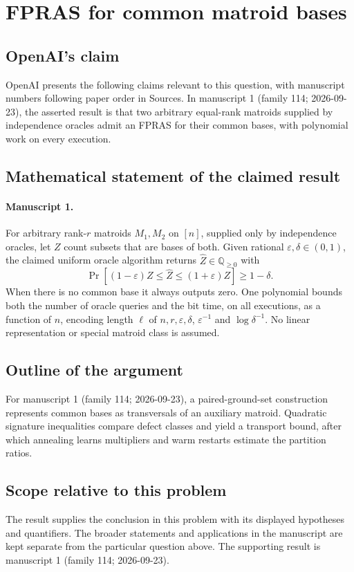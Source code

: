 \documentclass[11pt]{article}
\begin{document}
\section*{FPRAS for common matroid bases}

\subsection{OpenAI's claim}
OpenAI presents the following claims relevant to this question, with manuscript numbers following paper order in Sources. In manuscript 1 (family 114; 2026-09-23), the asserted result is that two arbitrary equal-rank matroids supplied by independence oracles admit an FPRAS for their common bases, with polynomial work on every execution.

\subsection{Mathematical statement of the claimed result}
\paragraph{Manuscript 1.}
For arbitrary rank-$r$ matroids $M_1,M_2$ on $[n]$, supplied only by independence oracles, let $Z$ count subsets that are bases of both. Given rational $\varepsilon,\delta\in(0,1)$, the claimed uniform oracle algorithm returns $\widehat Z\in\mathbb Q_{\ge0}$ with
\[
 \Pr[(1-\varepsilon)Z\le\widehat Z\le(1+\varepsilon)Z]\ge1-\delta.
\]
When there is no common base it always outputs zero. One polynomial bounds both the number of oracle queries and the bit time, on all executions, as a function of $n$, encoding length $\ell$ of $n,r,\varepsilon,\delta$, $\varepsilon^{-1}$ and $\log\delta^{-1}$. No linear representation or special matroid class is assumed.

\subsection{Outline of the argument}
For manuscript 1 (family 114; 2026-09-23), a paired-ground-set construction represents common bases as transversals of an auxiliary matroid. Quadratic signature inequalities compare defect classes and yield a transport bound, after which annealing learns multipliers and warm restarts estimate the partition ratios.

\subsection{Scope relative to this problem}
The result supplies the conclusion in this problem with its displayed hypotheses and quantifiers. The broader statements and applications in the manuscript are kept separate from the particular question above. The supporting result is manuscript 1 (family 114; 2026-09-23).
\end{document}

